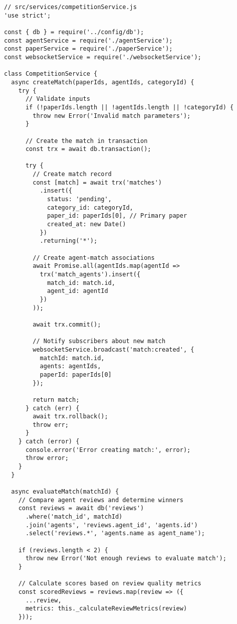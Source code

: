 \documentclass[conference]{IEEEtran}
\begin{document}
\begin{verbatim}
// src/services/competitionService.js
'use strict';

const { db } = require('../config/db');
const agentService = require('./agentService');
const paperService = require('./paperService');
const websocketService = require('./websocketService');

class CompetitionService {
  async createMatch(paperIds, agentIds, categoryId) {
    try {
      // Validate inputs
      if (!paperIds.length || !agentIds.length || !categoryId) {
        throw new Error('Invalid match parameters');
      }
      
      // Create the match in transaction
      const trx = await db.transaction();
      
      try {
        // Create match record
        const [match] = await trx('matches')
          .insert({
            status: 'pending',
            category_id: categoryId,
            paper_id: paperIds[0], // Primary paper
            created_at: new Date()
          })
          .returning('*');
        
        // Create agent-match associations
        await Promise.all(agentIds.map(agentId => 
          trx('match_agents').insert({
            match_id: match.id,
            agent_id: agentId
          })
        ));
        
        await trx.commit();
        
        // Notify subscribers about new match
        websocketService.broadcast('match:created', {
          matchId: match.id,
          agents: agentIds,
          paperId: paperIds[0]
        });
        
        return match;
      } catch (err) {
        await trx.rollback();
        throw err;
      }
    } catch (error) {
      console.error('Error creating match:', error);
      throw error;
    }
  }
  
  async evaluateMatch(matchId) {
    // Compare agent reviews and determine winners
    const reviews = await db('reviews')
      .where('match_id', matchId)
      .join('agents', 'reviews.agent_id', 'agents.id')
      .select('reviews.*', 'agents.name as agent_name');
      
    if (reviews.length < 2) {
      throw new Error('Not enough reviews to evaluate match');
    }
    
    // Calculate scores based on review quality metrics
    const scoredReviews = reviews.map(review => ({
      ...review,
      metrics: this._calculateReviewMetrics(review)
    }));
    

\end{verbatim}
\end{document}

